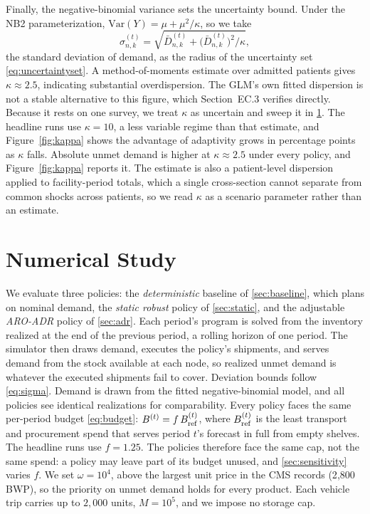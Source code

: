 \documentclass[11pt]{article}
\begin{document}
Finally, the negative-binomial variance sets the uncertainty bound.
Under the NB2 parameterization, $\mathrm{Var}(Y) = \mu + \mu^2/\kappa$, so we take
\begin{equation}
\sigma_{n,k}^{(t)} = \sqrt{\bar D_{n,k}^{(t)} + \big(\bar D_{n,k}^{(t)}\big)^2 / \kappa},
\label{eq:sigma}
\end{equation}
the standard deviation of demand, as the radius of the uncertainty set \eqref{eq:uncertaintyset}.
A method-of-moments estimate over admitted patients gives $\kappa \approx 2.5$, indicating substantial overdispersion.
The GLM's own fitted dispersion is not a stable alternative to this figure, which Section~EC.3 verifies directly.
Because it rests on one survey, we treat $\kappa$ as uncertain and sweep it in \Sec\ref{sec:results}.
The headline runs use $\kappa = 10$, a less variable regime than that estimate, and Figure~\ref{fig:kappa} shows the advantage of adaptivity grows in percentage points as $\kappa$ falls.
Absolute unmet demand is higher at $\kappa \approx 2.5$ under every policy, and Figure~\ref{fig:kappa} reports it.
The estimate is also a patient-level dispersion applied to facility-period totals, which a single cross-section cannot separate from common shocks across patients, so we read $\kappa$ as a scenario parameter rather than an estimate.

\section{Numerical Study}
\label{sec:results}

We evaluate three policies: the \emph{deterministic} baseline of \Sec\ref{sec:baseline}, which plans on nominal demand, the \emph{static robust} policy of \Sec\ref{sec:static}, and the adjustable \emph{ARO-ADR} policy of \Sec\ref{sec:adr}.
Each period's program is solved from the inventory realized at the end of the previous period, a rolling horizon of one period.
The simulator then draws demand, executes the policy's shipments, and serves demand from the stock available at each node, so realized unmet demand is whatever the executed shipments fail to cover.
Deviation bounds follow \eqref{eq:sigma}.
Demand is drawn from the fitted negative-binomial model, and all policies see identical realizations for comparability.
Every policy faces the same per-period budget \eqref{eq:budget}: $B^{(t)} = f\,B_{\rm ref}^{(t)}$, where $B_{\rm ref}^{(t)}$ is the least transport and procurement spend that serves period $t$'s forecast in full from empty shelves.
The headline runs use $f = 1.25$.
The policies therefore face the same cap, not the same spend: a policy may leave part of its budget unused, and \Sec\ref{sec:sensitivity} varies $f$.
We set $\omega = 10^4$, above the largest unit price in the CMS records (2{,}800 BWP), so the priority on unmet demand holds for every product.
Each vehicle trip carries up to $2{,}000$ units, $M = 10^5$, and we impose no storage cap.
\end{document}

